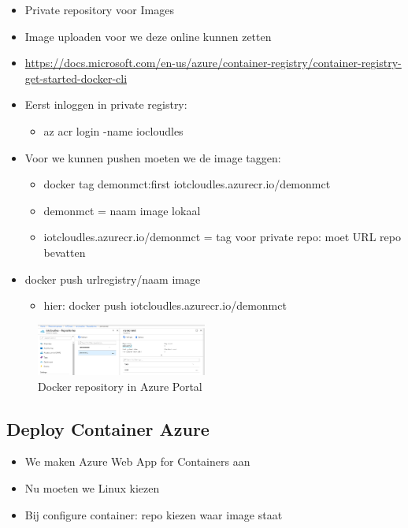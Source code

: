 \documentclass{article}
\begin{document}
\begin{itemize}
    \item Private repository voor Images
    \item Image uploaden voor we deze online kunnen zetten
    \item \url{https://docs.microsoft.com/en-us/azure/container-registry/container-registry-get-started-docker-cli}
    \item Eerst inloggen in private registry:
    \begin{itemize}
        \item az acr login -name iocloudles
    \end{itemize}
    \item Voor we kunnen pushen moeten we de image taggen:
    \begin{itemize}
        \item docker tag demonmct:first iotcloudles.azurecr.io/demonmct
        \item demonmct = naam image lokaal
        \item iotcloudles.azurecr.io/demonmct = tag voor private repo: moet URL repo bevatten
    \end{itemize}
    \item docker push urlregistry/naam image
    \begin{itemize}
        \item hier: docker push iotcloudles.azurecr.io/demonmct
    \end{itemize}
\end{itemize}

\begin{figure}[H]
    \centering
    \includegraphics[width=0.5\textwidth]{docker-azure.png}
    \caption{Docker repository in Azure Portal}
\end{figure}

\subsection{Deploy Container Azure}

\begin{itemize}
    \item We maken Azure Web App for Containers aan
    \item Nu moeten we Linux kiezen
    \item Bij configure container: repo kiezen waar image staat
\end{itemize}
\end{document}
